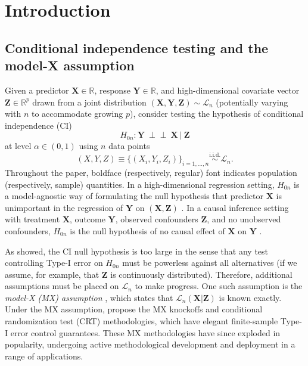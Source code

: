 \documentclass[aos]{imsart}
\theoremstyle{plain}
\theoremstyle{remark}
\newcommand{\R}{\mathbb{R}}								%
\newcommand{\independent}{{\perp \! \! \! \perp}}		%
\newcommand{\iidsim}{\stackrel{\mathrm{i.i.d.}}{\sim}} 	%
\newcommand{\prx}{\bm X}								%
\newcommand{\srx}{X}									%
\newcommand{\prz}{\bm Z}								%
\newcommand{\srz}{Z}									%
\newcommand{\pry}{{\bm Y}}								%
\newcommand{\sry}{Y}									%
\newcommand{\law}{\mathcal L}							%
\begin{document}
\section{Introduction}
	
\subsection{Conditional independence testing and the model-X assumption} \label{sec:ci-testing-and-mx}

Given a predictor $\prx \in \R$, response $\pry \in \R$, and high-dimensional covariate vector $\prz \in \R^{p}$ drawn from a joint distribution $(\prx, \pry, \prz) \sim \law_n$ (potentially varying with $n$ to accommodate growing $p$), consider testing the hypothesis of conditional independence (CI)
\begin{equation}
    H_{0n}: \pry\ \independent\ \prx\ |\ \prz
    \label{conditional-independence}
\end{equation}
at level $\alpha \in (0,1)$ using $n$ data points
\begin{equation}
    \label{eq:xyz}
    (\srx, \sry, \srz) \equiv \{(\srx_i, \sry_i, \srz_i)\}_{i = 1, \dots, n} \iidsim \law_n. 
\end{equation}
Throughout the paper, boldface (respectively, regular) font indicates population (respectively, sample) quantities. In a high-dimensional regression setting, $H_{0n}$ is a model-agnostic way of formulating the null hypothesis that predictor $\prx$ is unimportant in the regression of $\pry$ on $(\prx, \prz)$ \citep{CetL16}. In a causal inference setting with treatment $\prx$, outcome $\pry$, observed confounders $\prz$, and no unobserved confounders, $H_{0n}$ is the null hypothesis of no causal effect of $\prx$ on $\pry$ \citep{Pearl2009}.

As \citet{Shah2018} showed, the CI null hypothesis is too large in the sense that any test controlling Type-I error on $H_{0n}$ must be powerless against all alternatives (if we assume, for example, that $\prz$ is continuously distributed). Therefore, additional assumptions must be placed on $\law_n$ to make progress. One such assumption is the \textit{model-X (MX) assumption} \citep{CetL16}, which states that $\law_n(\prx | \prz)$ is known exactly. Under the MX assumption, \citet{CetL16} propose the MX knockoffs and conditional randomization test (CRT) methodologies, which have elegant finite-sample Type-I error control guarantees. These MX methodologies have since exploded in popularity, undergoing active methodological development and deployment in a range of applications.
\end{document}
